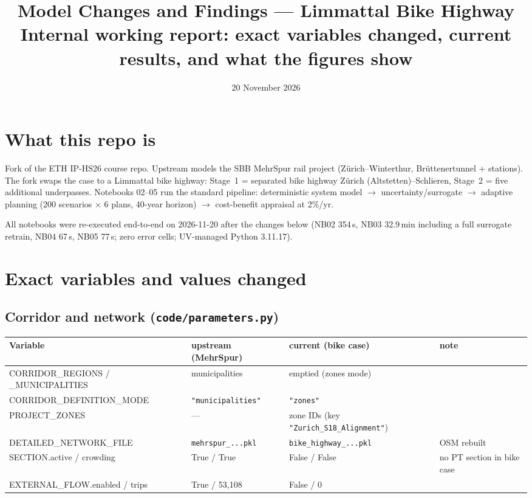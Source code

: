\documentclass[10pt,a4paper]{article}
\title{Model Changes and Findings --- Limmattal Bike Highway\\[2pt]
\large Internal working report: exact variables changed, current results, and what the figures show}
\date{20 November 2026}
\begin{document}
\sloppy
\maketitle
\tableofcontents

\section{What this repo is}
Fork of the ETH IP-HS26 course repo. Upstream models the SBB MehrSpur rail project
(Z\"urich--Winterthur, Br\"uttenertunnel + stations). The fork swaps the case to a
Limmattal bike highway: Stage~1 = separated bike highway Z\"urich (Altstetten)--Schlieren,
Stage~2 = five additional underpasses. Notebooks 02--05 run the standard pipeline:
deterministic system model $\to$ uncertainty/surrogate $\to$ adaptive planning (200
scenarios $\times$ 6 plans, 40-year horizon) $\to$ cost-benefit appraisal at 2\%/yr.

All notebooks were re-executed end-to-end on 2026-11-20 after the changes below
(NB02 354\,s, NB03 32.9\,min including a full surrogate retrain, NB04 67\,s, NB05 77\,s;
zero error cells; UV-managed Python 3.11.17).

\section{Exact variables and values changed}

\subsection{Corridor and network (\texttt{code/parameters.py})}
\begin{center}\small\begin{tabular}{@{}>{\RaggedRight\arraybackslash}p{4.6cm}>{\RaggedRight\arraybackslash}p{3.4cm}>{\RaggedRight\arraybackslash}p{4.6cm}>{\RaggedRight\arraybackslash}p{3.0cm}@{}}
\toprule
Variable & upstream (MehrSpur) & current (bike case) & note \\
\midrule
CORRIDOR\_REGIONS / \_MUNICIPALITIES & 9 municipalities & emptied (zones mode) & \\
CORRIDOR\_DEFINITION\_MODE & \texttt{"municipalities"} & \texttt{"zones"} & \\
PROJECT\_ZONES & --- & 110 zone IDs (key \texttt{"Zurich\_S18\_Alignment"}) & \\
DETAILED\_NETWORK\_FILE & \texttt{mehrspur\_...pkl} & \texttt{bike\_highway\_...pkl} & OSM rebuilt \\
SECTION.active / crowding & True / True & False / False & no PT section in bike case \\
EXTERNAL\_FLOW.enabled / trips & True / 53{,}108 & False / 0 & \\
\bottomrule
\end{tabular}\end{center}
\end{document}

